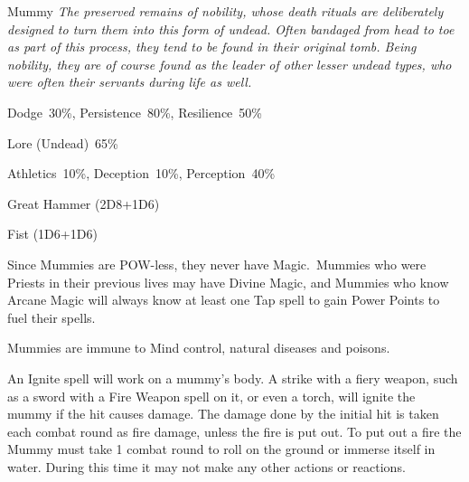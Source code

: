 \begin{monsterbox}{Mummy}
	\textit{The preserved remains of nobility, whose death rituals are deliberately designed to turn them into this form of undead. Often bandaged from head to toe as part of this process, they tend to be found in their original tomb. Being nobility, they are of course found as the leader of other lesser undead types, who were often their servants during life as well.}\\
	\rpghline
	\basics[%
        hitpoints  = 18,
	majorwound = 9,
	damagemodifier = +1D6,
	powerpoints = 0,
	movementrate = 15m,
	armor = Tough Skin (2AP),
	plunderrating = 4
	]
	\rpghline%
	\stats[ %
		STR = 3D6+12 (23),
		CON = 3D6+12 (23),
		DEX = 2D6    (4),
		SIZ = 2D6+6  (13),
		INT = 2D6+6  (13),
		POW = 0      (0),
		CHA = 1      (1)
	]
	\rpghline%
	\begin{rpg-monsteraction}[Resistances]
		Dodge~30\%, Persistence~80\%, Resilience~50\%
	\end{rpg-monsteraction}
	\begin{rpg-monsteraction}[Knowledge]
		Lore (Undead)~65\%
	\end{rpg-monsteraction}
	\begin{rpg-monsteraction}[Practical]
		Athletics~10\%, Deception~10\%, Perception~40\%
	\end{rpg-monsteraction}
	\begin{rpg-monsteraction}
		Great Hammer (2D8+1D6)
	\end{rpg-monsteraction}
	\begin{rpg-monsteraction}
		Fist (1D6+1D6)
	\end{rpg-monsteraction}
	\begin{rpg-monsteraction}[Magic]
		Since Mummies are POW-less, they never have Magic. Mummies who were Priests in their previous lives may have Divine Magic, and Mummies who know Arcane Magic will always know at least one Tap spell to gain Power Points to fuel their spells.
	\end{rpg-monsteraction}
	\begin{rpg-monsteraction}[Immunities]
		Mummies are immune to Mind control, natural diseases and poisons.
	\end{rpg-monsteraction}
	\begin{rpg-monsteraction}[Flammable]
		An Ignite spell will work on a mummy’s body. A strike with a fiery weapon, such as a sword with a Fire Weapon spell on it, or even a torch, will ignite the mummy if the hit causes damage. The damage done by the initial hit is taken each combat round as fire damage, unless the fire is put out. To put out a fire the Mummy must take 1 combat round to roll on the ground or immerse itself in water. During this time it may not make any other actions or reactions.

\end{rpg-monsteraction}
\end{monsterbox}
